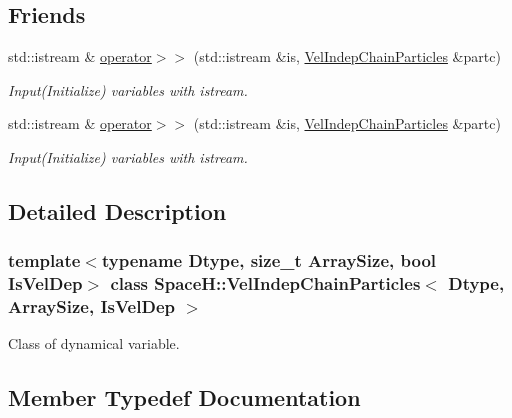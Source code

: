 \subsection*{Friends}
\begin{DoxyCompactItemize}
\item 
std\+::istream \& \mbox{\hyperlink{class_space_h_1_1_vel_indep_chain_particles_a87208692311239cfefd6d58ea4ce39ce}{operator$>$$>$}} (std\+::istream \&is, \mbox{\hyperlink{class_space_h_1_1_vel_indep_chain_particles}{Vel\+Indep\+Chain\+Particles}} \&partc)
\begin{DoxyCompactList}\small\item\em Input(\+Initialize) variables with istream. \end{DoxyCompactList}\item 
std\+::istream \& \mbox{\hyperlink{class_space_h_1_1_vel_indep_chain_particles_a87208692311239cfefd6d58ea4ce39ce}{operator$>$$>$}} (std\+::istream \&is, \mbox{\hyperlink{class_space_h_1_1_vel_indep_chain_particles}{Vel\+Indep\+Chain\+Particles}} \&partc)
\begin{DoxyCompactList}\small\item\em Input(\+Initialize) variables with istream. \end{DoxyCompactList}\end{DoxyCompactItemize}


\subsection{Detailed Description}
\subsubsection*{template$<$typename Dtype, size\+\_\+t Array\+Size, bool Is\+Vel\+Dep$>$\newline
class Space\+H\+::\+Vel\+Indep\+Chain\+Particles$<$ Dtype, Array\+Size, Is\+Vel\+Dep $>$}

Class of dynamical variable. 

\subsection{Member Typedef Documentation}
\mbox{\label{class_space_h_1_1_vel_indep_chain_particles_a071fb842f4ccb3ff01015c1105302e8a}} 
